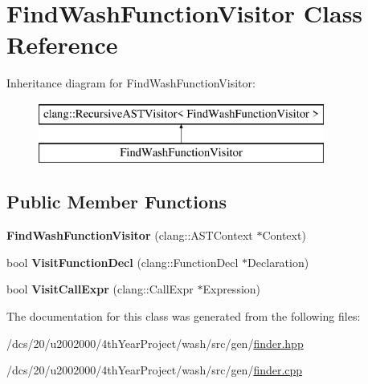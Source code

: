 \hypertarget{classFindWashFunctionVisitor}{}\section{Find\+Wash\+Function\+Visitor Class Reference}
\label{classFindWashFunctionVisitor}
Inheritance diagram for Find\+Wash\+Function\+Visitor\+:\begin{figure}[H]
\begin{center}
\leavevmode
\includegraphics[height=2.000000cm]{classFindWashFunctionVisitor}
\end{center}
\end{figure}
\subsection*{Public Member Functions}
\begin{DoxyCompactItemize}
\item 
\mbox{\label{classFindWashFunctionVisitor_a83067680ea5327ae0e11defa2a7febe7}} 
{\bfseries Find\+Wash\+Function\+Visitor} (clang\+::\+A\+S\+T\+Context $\ast$Context)
\item 
\mbox{\label{classFindWashFunctionVisitor_a4a2537acabc326871fa4b7ad80713704}} 
bool {\bfseries Visit\+Function\+Decl} (clang\+::\+Function\+Decl $\ast$Declaration)
\item 
\mbox{\label{classFindWashFunctionVisitor_af5fd9befa463954aa1124fae02ed7098}} 
bool {\bfseries Visit\+Call\+Expr} (clang\+::\+Call\+Expr $\ast$Expression)
\end{DoxyCompactItemize}


The documentation for this class was generated from the following files\+:\begin{DoxyCompactItemize}
\item 
/dcs/20/u2002000/4th\+Year\+Project/wash/src/gen/\mbox{\hyperlink{finder_8hpp}{finder.\+hpp}}\item 
/dcs/20/u2002000/4th\+Year\+Project/wash/src/gen/\mbox{\hyperlink{finder_8cpp}{finder.\+cpp}}\end{DoxyCompactItemize}
